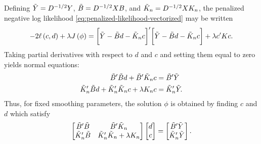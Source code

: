 Defining $\tilde{Y} = D^{-1/2} Y$, $\tilde{B} = D^{-1/2} X B $, and $\tilde{K}_n = D^{-1/2} X K_n$, the penalized negative log likelihood \eqref{eq:penalized-likelihood-vectorized} may be written
\begin{equation}\label{eq:penalized-loglik-tilde-vectorized}
-2\ell \left(c, d \right) + \lambda J\left( \phi \right) = \bigg[ \tilde{Y} - \tilde{B} d - \tilde{K}_n c\bigg]'\bigg[ \tilde{Y} - \tilde{B} d - \tilde{K}_n c\bigg] + \lambda c'Kc.
\end{equation}
\noindent
Taking partial derivatives with respect to $d$ and $c$ and setting them equal to zero yields normal equations: 
\begin{align}
\begin{split}
\tilde{B}'\tilde{B} d + \tilde{B}'\tilde{K}_n c &= \tilde{B}' \tilde{Y} \\
\tilde{K}_n'\tilde{B} d + \tilde{K}_n'\tilde{K}_n c + \lambda K_n c &= \tilde{K}_n' \tilde{Y}.
\end{split}
\end{align}
\noindent
Thus, for fixed smoothing parameters, the solution $\phi$ is obtained by finding $c$ and $d$ which satisfy
\begin{equation} \label{eq:vectorized-normal-equations}
\begin{bmatrix}
\tilde{B}'\tilde{B} & \tilde{B}'\tilde{K}_n \\
\tilde{K}_n'\tilde{B} & \tilde{K}_n'\tilde{K}_n + \lambda K_n\\
\end{bmatrix}
\begin{bmatrix}
d\\
c\\
\end{bmatrix}
= \begin{bmatrix}
\tilde{B}'\tilde{Y} \\
 \tilde{K}_n'\tilde{Y}\\
\end{bmatrix}.
\end{equation}

